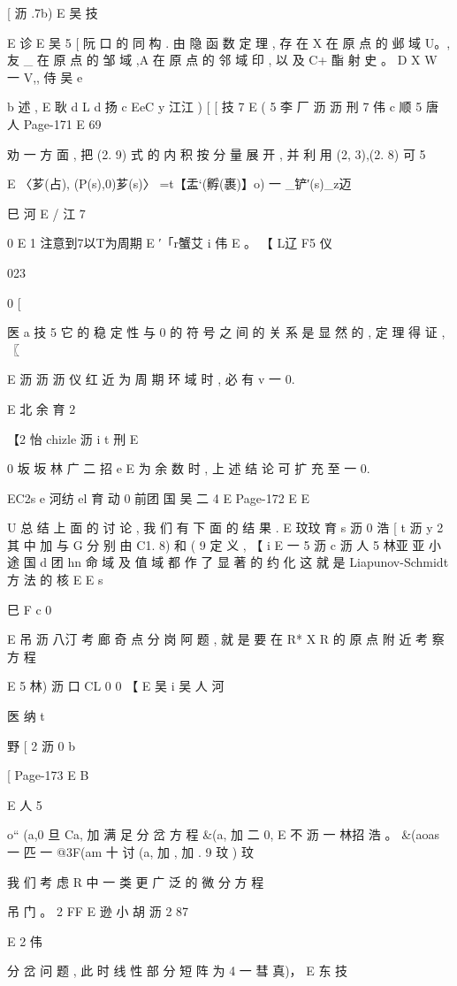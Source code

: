 {{{{{{{{{{{{{{{{{{[ 沥 .7b)
E 吴 技

E 诊
E 吴 5 [ 阮 口
的 同 构 . 由 隐 函 数 定 理 , 存 在 X 在 原 点 的 邺 域 U。, 友 _ 在 原 点 的
邹 域 ,A 在 原 点 的 邻 域 印 , 以 及 C+ 酯 射 史 。 D X W 一 V,, 侍
吴 e

b 述 ,
E 耿 d L d 扬
c
EeC y 江江 ) [
[ 技 7
E ( 5 李 厂 沥 沥 刑 7 伟 c 顺 5 唐 人
Page-171
E 69

劝 一 方 面 , 把 (2. 9) 式 的 内 积 按 分 量 展 开 , 并 利 用 (2, 3),(2. 8) 可
5

E 〈芗(占), (P(s),0)芗(s)〉
=t【盂`(孵(裹)】o) 一 _铲′(s)_z迈

巳 河 E /
江 7

0
E
1
注意到7以T为周期 E
′「r蟹艾 i 伟 E
。 【 L辽 F5 仪

023

0
[

医 a 技 5
它 的 稳 定 性 与 0 的 符 号 之 间 的 关 系 是 显 然 的 , 定 理 得 证 , 〖

E 沥 沥 沥 仪 红
近 为 周 期 环 域 时 , 必 有 v 一 0.

E 北 余 育 2

【2 怡 chizle 沥 i t 刑
E

0 坂 坂 林 广 二 招 e
E
为 余 数 时 , 上 述 结 论 可 扩 充 至 一 0.

EC2s e 河纺 el 育 动 0 前团 国 吴 二 4
E
Page-172
E E

U
总 结 上 面 的 讨 论 , 我 们 有 下 面 的 结 果 .
E 玟玟 育 s 沥 0 浩
[ t
沥 y
2
其 中 加 与 G 分 别 由 C1. 8) 和 ( 9 定 义 , 【
i
E 一 5 沥 c 沥 人 5 林亚 亚 小 途 国
d 团 hn 命
域 及 值 域 都 作 了 显 著 的 约 化 这 就 是 Liapunov-Schmidt 方 法 的 核
E
E
s

巳
F c 0

E 吊 沥 八汀
考 廊 奇 点 分 岗 阿 题 , 就 是 要 在 R* X R 的 原 点 附 近 考 察 方 程

E 5 林) 沥 口 CL 0
0
【
E 吴 i 吴
人 河

医 纳 t

野
[ 2 沥 0
b

[
Page-173
E B

E 人 5

o“ (a,0 旦 Ca, 加 满 足 分 岔 方 程
&(a, 加 二 0,
E 不 沥 一 林招 浩 。
&(aoas 一 匹 一 @3F(am 十 讨 (a, 加 , 加 . 9 玟 )
玟

我 们 考 虑 R 中 一 类 更 广 泛 的 微 分 方 程

吊
门 。 2
FF E 逊 小 胡 沥 2 87

E 2 伟

分 岔 问 题 , 此 时 线 性 部 分 短 阵 为 4 一 彗 真)， E 东 技

}}}}}}}}}}}}}}}}}}

